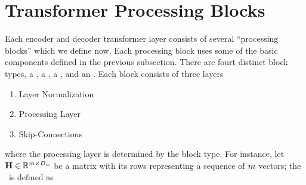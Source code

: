 \section{Transformer Processing Blocks}
Each encoder and decoder transformer layer consists of several
``processing blocks'' which we define now. Each processing block 
uses some of the basic components defined in the previous subsection.
%  
  There are fourt distinct block types, a \feedforwardblock, a \selfattentionblock, a \maskedselfattentionblock, and an \encoderattentionblock. 
  Each block consists of three layers
    \begin{enumerate}
        \item Layer Normalization
        \item Processing Layer
        \item Skip-Connections
    \end{enumerate}
    where the processing layer is determined by the block type. For instance,
    let $\mathbf{H} \in \mathbb{R}^{m \times D_{w}}$ be a
    matrix with its rows representing a sequence of $m$ vectors; the \feedforwardblock~is defined as \\

